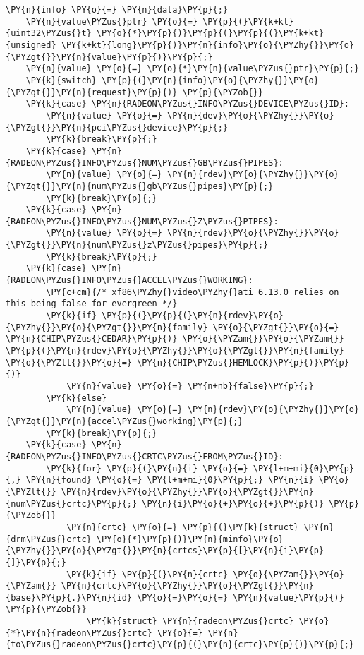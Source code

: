 \begin{Verbatim}[commandchars=\\\{\}]
	\PY{n}{info} \PY{o}{=} \PY{n}{data}\PY{p}{;}
	\PY{n}{value\PYZus{}ptr} \PY{o}{=} \PY{p}{(}\PY{k+kt}{uint32\PYZus{}t} \PY{o}{*}\PY{p}{)}\PY{p}{(}\PY{p}{(}\PY{k+kt}{unsigned} \PY{k+kt}{long}\PY{p}{)}\PY{n}{info}\PY{o}{\PYZhy{}}\PY{o}{\PYZgt{}}\PY{n}{value}\PY{p}{)}\PY{p}{;}
	\PY{n}{value} \PY{o}{=} \PY{o}{*}\PY{n}{value\PYZus{}ptr}\PY{p}{;}
	\PY{k}{switch} \PY{p}{(}\PY{n}{info}\PY{o}{\PYZhy{}}\PY{o}{\PYZgt{}}\PY{n}{request}\PY{p}{)} \PY{p}{\PYZob{}}
	\PY{k}{case} \PY{n}{RADEON\PYZus{}INFO\PYZus{}DEVICE\PYZus{}ID}:
		\PY{n}{value} \PY{o}{=} \PY{n}{dev}\PY{o}{\PYZhy{}}\PY{o}{\PYZgt{}}\PY{n}{pci\PYZus{}device}\PY{p}{;}
		\PY{k}{break}\PY{p}{;}
	\PY{k}{case} \PY{n}{RADEON\PYZus{}INFO\PYZus{}NUM\PYZus{}GB\PYZus{}PIPES}:
		\PY{n}{value} \PY{o}{=} \PY{n}{rdev}\PY{o}{\PYZhy{}}\PY{o}{\PYZgt{}}\PY{n}{num\PYZus{}gb\PYZus{}pipes}\PY{p}{;}
		\PY{k}{break}\PY{p}{;}
	\PY{k}{case} \PY{n}{RADEON\PYZus{}INFO\PYZus{}NUM\PYZus{}Z\PYZus{}PIPES}:
		\PY{n}{value} \PY{o}{=} \PY{n}{rdev}\PY{o}{\PYZhy{}}\PY{o}{\PYZgt{}}\PY{n}{num\PYZus{}z\PYZus{}pipes}\PY{p}{;}
		\PY{k}{break}\PY{p}{;}
	\PY{k}{case} \PY{n}{RADEON\PYZus{}INFO\PYZus{}ACCEL\PYZus{}WORKING}:
		\PY{c+cm}{/* xf86\PYZhy{}video\PYZhy{}ati 6.13.0 relies on this being false for evergreen */}
		\PY{k}{if} \PY{p}{(}\PY{p}{(}\PY{n}{rdev}\PY{o}{\PYZhy{}}\PY{o}{\PYZgt{}}\PY{n}{family} \PY{o}{\PYZgt{}}\PY{o}{=} \PY{n}{CHIP\PYZus{}CEDAR}\PY{p}{)} \PY{o}{\PYZam{}}\PY{o}{\PYZam{}} \PY{p}{(}\PY{n}{rdev}\PY{o}{\PYZhy{}}\PY{o}{\PYZgt{}}\PY{n}{family} \PY{o}{\PYZlt{}}\PY{o}{=} \PY{n}{CHIP\PYZus{}HEMLOCK}\PY{p}{)}\PY{p}{)}
			\PY{n}{value} \PY{o}{=} \PY{n+nb}{false}\PY{p}{;}
		\PY{k}{else}
			\PY{n}{value} \PY{o}{=} \PY{n}{rdev}\PY{o}{\PYZhy{}}\PY{o}{\PYZgt{}}\PY{n}{accel\PYZus{}working}\PY{p}{;}
		\PY{k}{break}\PY{p}{;}
	\PY{k}{case} \PY{n}{RADEON\PYZus{}INFO\PYZus{}CRTC\PYZus{}FROM\PYZus{}ID}:
		\PY{k}{for} \PY{p}{(}\PY{n}{i} \PY{o}{=} \PY{l+m+mi}{0}\PY{p}{,} \PY{n}{found} \PY{o}{=} \PY{l+m+mi}{0}\PY{p}{;} \PY{n}{i} \PY{o}{\PYZlt{}} \PY{n}{rdev}\PY{o}{\PYZhy{}}\PY{o}{\PYZgt{}}\PY{n}{num\PYZus{}crtc}\PY{p}{;} \PY{n}{i}\PY{o}{+}\PY{o}{+}\PY{p}{)} \PY{p}{\PYZob{}}
			\PY{n}{crtc} \PY{o}{=} \PY{p}{(}\PY{k}{struct} \PY{n}{drm\PYZus{}crtc} \PY{o}{*}\PY{p}{)}\PY{n}{minfo}\PY{o}{\PYZhy{}}\PY{o}{\PYZgt{}}\PY{n}{crtcs}\PY{p}{[}\PY{n}{i}\PY{p}{]}\PY{p}{;}
			\PY{k}{if} \PY{p}{(}\PY{n}{crtc} \PY{o}{\PYZam{}}\PY{o}{\PYZam{}} \PY{n}{crtc}\PY{o}{\PYZhy{}}\PY{o}{\PYZgt{}}\PY{n}{base}\PY{p}{.}\PY{n}{id} \PY{o}{=}\PY{o}{=} \PY{n}{value}\PY{p}{)} \PY{p}{\PYZob{}}
				\PY{k}{struct} \PY{n}{radeon\PYZus{}crtc} \PY{o}{*}\PY{n}{radeon\PYZus{}crtc} \PY{o}{=} \PY{n}{to\PYZus{}radeon\PYZus{}crtc}\PY{p}{(}\PY{n}{crtc}\PY{p}{)}\PY{p}{;}

\end{Verbatim}
